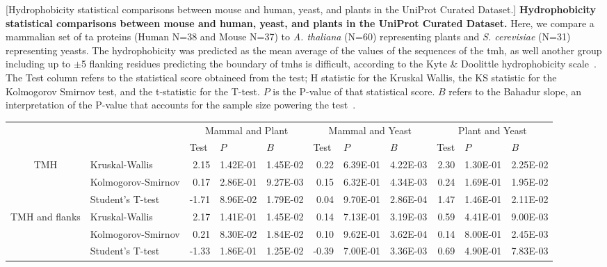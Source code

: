 \begin{table}[htbp]
\centering
{}[Hydrophobicity statistical comparisons between mouse and human, yeast, and plants in the UniProt Curated Dataset.]
{\textbf{Hydrophobicity statistical comparisons between mouse and human, yeast, and plants in the UniProt Curated Dataset.}
Here, we compare a mammalian set of \gls{ta} proteins (Human N=38 and Mouse N=37) to \textit{A. thaliana} (N=60) representing plants  and  \textit{S. cerevisiae} (N=31) representing yeasts.
The hydrophobicity was predicted as the mean average of the values of the sequences of the \gls{tmh}, as well another group including up to $\pm$5 flanking residues predicting the boundary of \gls{tmh}s is difficult, according to the Kyte \& Doolittle hydrophobicity scale~\cite{Kyte1982}.
The Test column refers to the statistical score obtaineed from the test; H statistic for the Kruskal Wallis, the KS statistic for the Kolmogorov Smirnov test, and the t-statistic for the T-test.
$P$ is the P-value of that statistical score.
$B$ refers to the Bahadur slope, an interpretation of the P-value that accounts for the sample size powering the test~\cite{Bahadur1967, Bahadur1971}.}
	\tiny

    \begin{tabular}{clrrrrrrrrr}
	          &       & \multicolumn{3}{c}{Mammal and Plant} & \multicolumn{3}{c}{Mammal and Yeast} & \multicolumn{3}{c}{Plant and Yeast} \\
	          &       & \multicolumn{1}{l}{ Test} & \multicolumn{1}{l}{ $P$} & \multicolumn{1}{l}{ $B$} & \multicolumn{1}{l}{ Test} & \multicolumn{1}{l}{ $P$} & \multicolumn{1}{l}{ $B$} & \multicolumn{1}{l}{ Test} & \multicolumn{1}{l}{ $P$} & \multicolumn{1}{l}{ $B$} \\
	    \multirow{3}[0]{*}{TMH } &  Kruskal-Wallis & 2.15  & 1.42E-01 & 1.45E-02 & 0.22  & 6.39E-01 & 4.22E-03 & 2.30  & 1.30E-01 & 2.25E-02 \\
	          &  Kolmogorov-Smirnov & 0.17  & 2.86E-01 & 9.27E-03 & 0.15  & 6.32E-01 & 4.34E-03 & 0.24  & 1.69E-01 & 1.95E-02 \\
	          &  Student's T-test & -1.71 & 8.96E-02 & 1.79E-02 & 0.04  & 9.70E-01 & 2.86E-04 & 1.47  & 1.46E-01 & 2.11E-02 \\
	    \multirow{3}[0]{*}{TMH and flanks } &  Kruskal-Wallis & 2.17  & 1.41E-01 & 1.45E-02 & 0.14  & 7.13E-01 & 3.19E-03 & 0.59  & 4.41E-01 & 9.00E-03 \\
	          &  Kolmogorov-Smirnov & 0.21  & 8.30E-02 & 1.84E-02 & 0.10  & 9.62E-01 & 3.62E-04 & 0.14  & 8.00E-01 & 2.45E-03 \\
	          &  Student's T-test & -1.33 & 1.86E-01 & 1.25E-02 & -0.39 & 7.00E-01 & 3.36E-03 & 0.69  & 4.90E-01 & 7.83E-03 \\
	    \end{tabular}%
					\label{table:speciestableuniprotstats}
	\end{table}%


